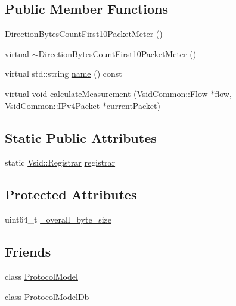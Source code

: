 \subsection*{Public Member Functions}
\begin{DoxyCompactItemize}
\item 
\hyperlink{class_vsid_1_1_direction_bytes_count_first10_packet_meter_ac8c099e8315697d156dd6703bbd66b56}{Direction\-Bytes\-Count\-First10\-Packet\-Meter} ()
\item 
virtual \hyperlink{class_vsid_1_1_direction_bytes_count_first10_packet_meter_a65a93a3738713de8bab4134fc0715659}{$\sim$\-Direction\-Bytes\-Count\-First10\-Packet\-Meter} ()
\item 
virtual std\-::string \hyperlink{class_vsid_1_1_direction_bytes_count_first10_packet_meter_a7b947a2f9a0c68e8f26d33731ddee1e4}{name} () const 
\item 
virtual void \hyperlink{class_vsid_1_1_direction_bytes_count_first10_packet_meter_a72110bee456d1160a70db709bd507d30}{calculate\-Measurement} (\hyperlink{class_vsid_common_1_1_flow}{Vsid\-Common\-::\-Flow} $\ast$flow, \hyperlink{class_vsid_common_1_1_i_pv4_packet}{Vsid\-Common\-::\-I\-Pv4\-Packet} $\ast$current\-Packet)
\end{DoxyCompactItemize}
\subsection*{Static Public Attributes}
\begin{DoxyCompactItemize}
\item 
static \hyperlink{class_vsid_1_1_registrar}{Vsid\-::\-Registrar} \hyperlink{class_vsid_1_1_direction_bytes_count_first10_packet_meter_aa7ad6a3924823d09b01d75eeba69f039}{registrar}
\end{DoxyCompactItemize}
\subsection*{Protected Attributes}
\begin{DoxyCompactItemize}
\item 
uint64\-\_\-t \hyperlink{class_vsid_1_1_direction_bytes_count_first10_packet_meter_a38e8da3cb56886292cc89ed2911decce}{\-\_\-overall\-\_\-byte\-\_\-size}
\end{DoxyCompactItemize}
\subsection*{Friends}
\begin{DoxyCompactItemize}
\item 
class \hyperlink{class_vsid_1_1_direction_bytes_count_first10_packet_meter_a80219b863d4ff3456933d16bc5f73f45}{Protocol\-Model}
\item 
class \hyperlink{class_vsid_1_1_direction_bytes_count_first10_packet_meter_a3c0d389e7a9476b06313d8fb9ca9fe68}{Protocol\-Model\-Db}
\end{DoxyCompactItemize}


